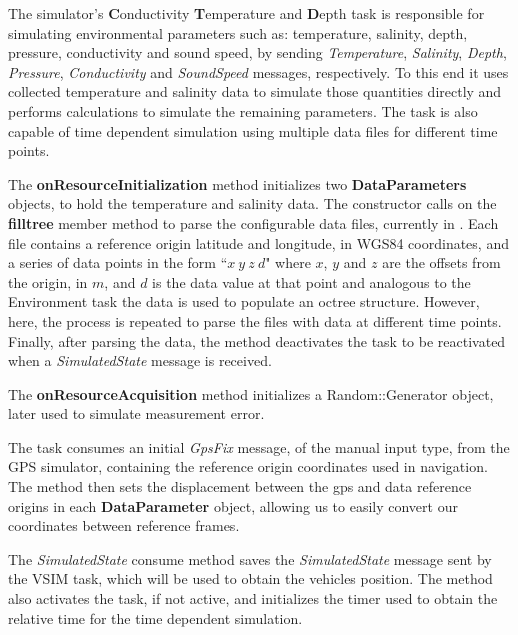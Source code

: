 \documentclass[10pt,a4paper]{article}
\begin{document}
\par The simulator's \textbf{C}onductivity \textbf{T}emperature and \textbf{D}epth task is responsible for simulating environmental parameters such as: temperature, salinity, depth, pressure, conductivity and sound speed, by sending \textit{Temperature}, \textit{Salinity}, \textit{Depth}, \textit{Pressure}, \textit{Conductivity} and \textit{SoundSpeed} messages, respectively. To this end it uses collected temperature and salinity data to simulate those quantities directly and performs calculations to simulate the remaining parameters. The task is also capable of time dependent simulation using multiple data files for different time points.

\par The \textbf{onResourceInitialization} method initializes two \textbf{DataParameters} objects, to hold the temperature and salinity data. The constructor calls on the \textbf{filltree} member method to parse the configurable data files, currently in . Each file contains a reference origin latitude and longitude, in WGS84 coordinates, and a series of data points in the form ``$x\ y\ z\ d$" where $x$, $y$ and $z$ are the offsets from the origin, in $m$, and $d$ is the data value at that point and analogous to the Environment task the data is used to populate an octree structure. However, here, the process is repeated to parse the files with data at different time points. Finally, after parsing the data, the method deactivates the task to be reactivated when a \textit{SimulatedState} message is received.

\par The \textbf{onResourceAcquisition} method initializes a Random::Generator object, later used to simulate measurement error.

\par The task consumes an initial \textit{GpsFix} message, of the manual input type, from the GPS simulator, containing the reference origin coordinates used in navigation. The method then sets the displacement between the gps and data reference origins in each \textbf{DataParameter} object, allowing us to easily convert our coordinates between reference frames.

\par The \textit{SimulatedState} consume method saves the \textit{SimulatedState} message sent by the VSIM task, which will be used to obtain the vehicles position. The method also activates the task, if not active, and initializes the timer used to obtain the relative time for the time dependent simulation.
\end{document}
